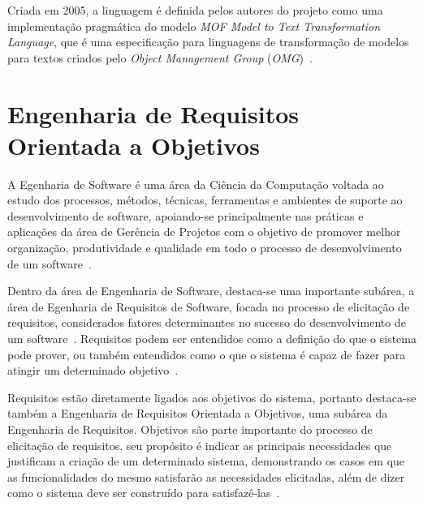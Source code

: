 Criada em 2005, a linguagem é definida pelos autores do projeto como uma implementação pragmática do modelo \textit{MOF Model to Text Transformation Language}, que é uma especificação para linguagens de transformação de modelos para textos criados pelo \textit{Object Management Group} (\textit{OMG})~\cite{SiteAcceleo}.


\section{Engenharia de Requisitos Orientada a Objetivos}
\label{sec-referencial-engenharia-objetivos}

A Egenharia de Software é uma área da Ciência da Computação voltada ao estudo dos processos, métodos, técnicas, ferramentas e ambientes de suporte ao desenvolvimento de software, apoiando-se principalmente nas práticas e aplicações da área de Gerência de Projetos com o objetivo de promover melhor organização, produtividade e qualidade em todo o processo de desenvolvimento de um software~\cite{falboEngSoft}.

Dentro da área de Engenharia de Software, destaca-se uma importante subárea, a área de Egenharia de Requisitos de Software, focada no processo de elicitação de requisitos, considerados fatores determinantes no sucesso do desenvolvimento de um software~\cite{falboEngReq}. Requisitos podem ser entendidos como a definição do que o sistema pode prover, ou também entendidos como o que o sistema é capaz de fazer para atingir um determinado objetivo~\cite{pfleeger2004engenharia}.

Requisitos estão diretamente ligados aos objetivos do sistema, portanto destaca-se também a Engenharia de Requisitos Orientada a Objetivos, uma subárea da Engenharia de Requisitos. Objetivos são parte importante do processo de elicitação de requisitos, seu propósito é indicar as principais necessidades que justificam a criação de um determinado sistema, demonstrando os casos em que as funcionalidades do mesmo satisfarão as necessidades elicitadas, além de dizer como o sistema deve ser construído para satisfazê-las~\cite{ross1977structured}. 

